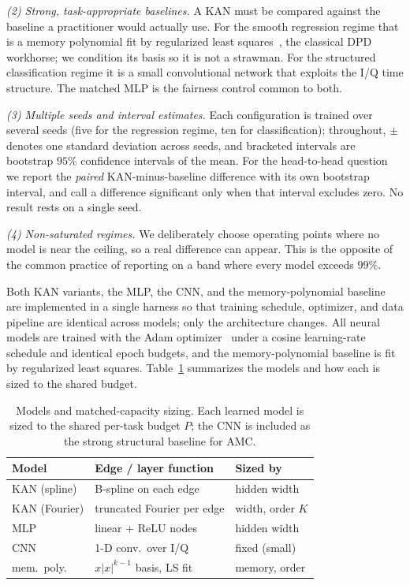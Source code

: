 \documentclass[final,5p,times]{elsarticle}
\begin{document}
\emph{(2) Strong, task-appropriate baselines.} A KAN must be compared against the
baseline a practitioner would actually use. For the smooth regression regime that is a
memory polynomial fit by regularized least squares~\cite{morgan2006gmp}, the classical DPD
workhorse; we condition its basis so it is not a strawman. For the structured
classification regime it is a small convolutional network that exploits the I/Q time
structure. The matched MLP is the fairness control common to both.

\emph{(3) Multiple seeds and interval estimates.} Each configuration is trained over
several seeds (five for the regression regime, ten for classification); throughout, $\pm$
denotes one standard deviation across seeds, and bracketed intervals are bootstrap $95\%$
confidence intervals of the mean. For the head-to-head question we report the \emph{paired}
KAN-minus-baseline difference with its own bootstrap interval, and call a difference
significant only when that interval excludes zero. No result rests on a single seed.

\emph{(4) Non-saturated regimes.} We deliberately choose operating points where no model
is near the ceiling, so a real difference can appear. This is the opposite of the common
practice of reporting on a band where every model exceeds $99\%$.

Both KAN variants, the MLP, the CNN, and the memory-polynomial baseline are implemented in
a single harness so that training schedule, optimizer, and data pipeline are identical
across models; only the architecture changes. All neural models are trained with the Adam
optimizer~\cite{kingma2015adam} under a cosine learning-rate schedule and identical epoch
budgets, and the memory-polynomial baseline is fit by regularized least squares. Table~\ref{tab:arch}
summarizes the models and how each is sized to the shared budget.

\begin{table}[t]
\centering
\caption{Models and matched-capacity sizing. Each learned model is sized to the shared
per-task budget $P$; the CNN is included as the strong structural baseline for AMC.}
\label{tab:arch}
\small
\setlength{\tabcolsep}{4pt}
\begin{tabular}{lll}
\toprule
Model & Edge / layer function & Sized by \\
\midrule
KAN (spline)  & B-spline on each edge      & hidden width \\
KAN (Fourier) & truncated Fourier per edge & width, order $K$ \\
MLP           & linear + ReLU nodes        & hidden width \\
CNN           & 1-D conv.\ over I/Q        & fixed (small) \\
mem.\ poly.   & $x|x|^{k-1}$ basis, LS fit & memory, order \\
\bottomrule
\end{tabular}
\end{table}
\end{document}
